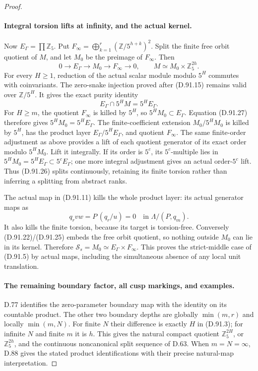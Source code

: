 \begin{proof}
\paragraph{Integral torsion lifts at infinity, and the actual kernel.}
Now \(E_\Gamma=\prod\mathbb Z_5\). Put
\(F_\infty=\bigoplus_{k=1}^r(\mathbb Z/5^{h+k})^2\).
Split the finite free orbit quotient of \(M\), and let
\(M_0\) be the preimage of \(F_\infty\). Then
\[
 0\longrightarrow E_\Gamma\longrightarrow M_0
              \longrightarrow F_\infty\longrightarrow0,
 \qquad M\simeq M_0\times\mathbb Z_5^{2h}.
                                                               \tag{D.91.26}
\]
For every \(H\ge1\), reduction of the actual scalar
module modulo \(5^H\) commutes with coinvariants. The
zero-snake injection proved after (D.91.15) remains valid
over \(\mathbb Z/5^H\). It gives the exact purity identity
\[
             E_\Gamma\cap5^H M=5^H E_\Gamma.
                                                               \tag{D.91.27}
\]
For \(H\ge m\), the quotient \(F_\infty\) is killed
by \(5^H\), so \(5^HM_0\subset E_\Gamma\). Equation
(D.91.27) therefore gives \(5^HM_0=5^HE_\Gamma\).
The finite-coefficient extension
\(M_0/5^HM_0\) is killed by \(5^H\), has the product
layer \(E_\Gamma/5^HE_\Gamma\), and quotient
\(F_\infty\). The same finite-order adjustment as above
provides a lift of each quotient generator of its exact
order modulo \(5^HM_0\). Lift it integrally. If its
order is \(5^c\), its \(5^c\)-multiple lies in
\(5^HM_0=5^HE_\Gamma\subset5^cE_\Gamma\); one more
integral adjustment gives an actual order-\(5^c\) lift.
Thus (D.91.26) splits continuously, retaining its finite
torsion rather than inferring a splitting from abstract ranks.

The actual map in (D.91.11) kills the whole product layer:
its actual generator maps as
\[
                      q_rvw=P\,(q_r/u)=0
                          \quad\text{in }\Lambda/(P,q_m).
                                                               \tag{D.91.28}
\]
It also kills the finite torsion, because its target is
torsion-free. Conversely (D.91.22)/(D.91.25) embeds the
free orbit quotient, so nothing outside \(M_0\) can
lie in its kernel. Therefore
\(\mathcal S_s=M_0\simeq E_\Gamma\times F_\infty\).
This proves the strict-middle case of (D.91.5) by actual
maps, including the simultaneous absence of any local
unit translation.

\paragraph{The remaining boundary factor, all cusp markings, and examples.}
D.77 identifies the zero-parameter boundary map with the
identity on its countable product. The other two boundary
depths are globally \(\min(m,r)\) and locally
\(\min(m,N)\). For finite \(N\) their difference is
exactly \(H\) in (D.91.3); for infinite \(N\) and
finite \(m\) it is \(h\). This gives the natural compact
quotient \(\mathbb Z_5^{2H}\), or \(\mathbb Z_5^{2h}\),
and the continuous noncanonical split sequence of D.63.
When \(m=N=\infty\), D.88 gives the stated product
identifications with their precise natural-map interpretation.


\end{proof}
